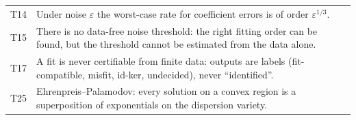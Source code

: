 \begin{center}
\begin{tabular}{@{}L{1.0cm}L{12.0cm}@{}}
T14 & Under noise $\varepsilon$ the worst-case rate for coefficient errors is of order $\varepsilon^{1/3}$.\\
T15 & There is no data-free noise threshold: the right fitting order can be found, but the threshold cannot be estimated from the data alone.\\
T17 & A fit is never certifiable from finite data: outputs are labels (fit-compatible, misfit, id-ker, undecided), never ``identified''.\\
T25 & Ehrenpreis--Palamodov: every solution on a convex region is a superposition of exponentials on the dispersion variety.\\
\bottomrule
\end{tabular}
\end{center}
